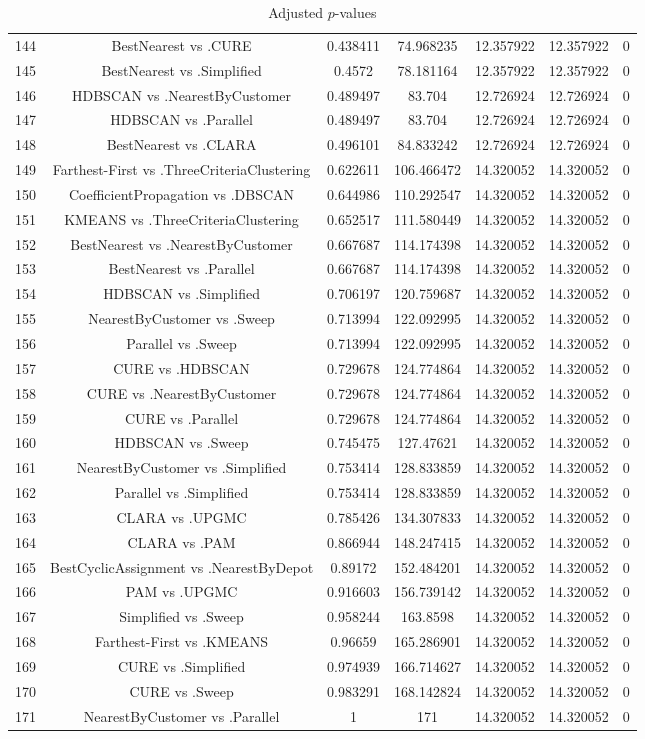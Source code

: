 \documentclass[a4paper,10pt]{article}
\begin{document}
\begin{landscape}
\begin{table}[!htp]
\begin{tabular}{ccccccc}
144&BestNearest vs .CURE&0.438411&74.968235&12.357922&12.357922&0\\
145&BestNearest vs .Simplified&0.4572&78.181164&12.357922&12.357922&0\\
146&HDBSCAN vs .NearestByCustomer&0.489497&83.704&12.726924&12.726924&0\\
147&HDBSCAN vs .Parallel&0.489497&83.704&12.726924&12.726924&0\\
148&BestNearest vs .CLARA&0.496101&84.833242&12.726924&12.726924&0\\
149&Farthest-First vs .ThreeCriteriaClustering&0.622611&106.466472&14.320052&14.320052&0\\
150&CoefficientPropagation vs .DBSCAN&0.644986&110.292547&14.320052&14.320052&0\\
151&KMEANS vs .ThreeCriteriaClustering&0.652517&111.580449&14.320052&14.320052&0\\
152&BestNearest vs .NearestByCustomer&0.667687&114.174398&14.320052&14.320052&0\\
153&BestNearest vs .Parallel&0.667687&114.174398&14.320052&14.320052&0\\
154&HDBSCAN vs .Simplified&0.706197&120.759687&14.320052&14.320052&0\\
155&NearestByCustomer vs .Sweep&0.713994&122.092995&14.320052&14.320052&0\\
156&Parallel vs .Sweep&0.713994&122.092995&14.320052&14.320052&0\\
157&CURE vs .HDBSCAN&0.729678&124.774864&14.320052&14.320052&0\\
158&CURE vs .NearestByCustomer&0.729678&124.774864&14.320052&14.320052&0\\
159&CURE vs .Parallel&0.729678&124.774864&14.320052&14.320052&0\\
160&HDBSCAN vs .Sweep&0.745475&127.47621&14.320052&14.320052&0\\
161&NearestByCustomer vs .Simplified&0.753414&128.833859&14.320052&14.320052&0\\
162&Parallel vs .Simplified&0.753414&128.833859&14.320052&14.320052&0\\
163&CLARA vs .UPGMC&0.785426&134.307833&14.320052&14.320052&0\\
164&CLARA vs .PAM&0.866944&148.247415&14.320052&14.320052&0\\
165&BestCyclicAssignment vs .NearestByDepot&0.89172&152.484201&14.320052&14.320052&0\\
166&PAM vs .UPGMC&0.916603&156.739142&14.320052&14.320052&0\\
167&Simplified vs .Sweep&0.958244&163.8598&14.320052&14.320052&0\\
168&Farthest-First vs .KMEANS&0.96659&165.286901&14.320052&14.320052&0\\
169&CURE vs .Simplified&0.974939&166.714627&14.320052&14.320052&0\\
170&CURE vs .Sweep&0.983291&168.142824&14.320052&14.320052&0\\
171&NearestByCustomer vs .Parallel&1&171&14.320052&14.320052&0\\
\hline
\end{tabular}
\caption{Adjusted $p$-values}
\end{table}

\end{landscape}
\end{document}
